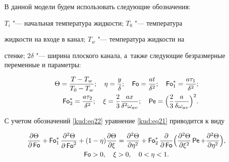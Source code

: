 В данной модели будем использовать следующие обозначения:

 $T_{i}$ "--- начальная температура жидкости; $T_0$ "--- температура

жидкости на входе в канал; $T_{w}$ "--- температура жидкости на

стенке; $2\delta$ "--- ширина плоского канала, а~также  следующие  безразмерные переменные и параметры: 

\begin{equation}

\label{kud:eq22}

\begin{aligned}

\Theta=\frac{T-T_{w}}{T_0 -T_{w} };

\quad

\eta =\frac{y}{ \delta };

\quad

\operatorname{\sf Fo}=\frac{at}{\delta^2}; \quad

\operatorname{\sf Fo}_1^* =\frac{a \tau_1}{ \delta^2}; \\

\operatorname{\sf Fo}_2^* =\frac{a \tau_2 }{ \delta^2}; \quad

\xi=\frac{2}{3}\frac{ax}{ \delta^ 2 \omega_{av} }; \quad

\operatorname{\sf Pe}=\Bigl(\frac{2}{3}\frac{a}{\delta \omega_{av} }

\Bigr)^2.

\end{aligned}

\end{equation}

С учетом обозначений \eqref{kud:eq22} уравнение \eqref{kud:eq21} приводится к виду

\begin{equation}

\label{kud:eq23}

\begin{array}{c}

\displaystyle 

\frac{\partial  \Theta}{\partial \operatorname{\sf Fo}}+

\operatorname{\sf Fo}_1 ^* \frac{\partial^2 \Theta}{\partial \operatorname{\sf Fo}^ {2}}+(1- \eta

)\frac{\partial  \Theta}{\partial  \xi} =\frac{\partial

^2 \Theta}{\partial \eta^2}+\operatorname{\sf Fo}_2^* \frac{\partial

}{\partial \operatorname{\sf Fo}}

\Bigl(\frac{\partial^2 \Theta}{\partial  \xi^2} \operatorname{\sf Pe}+\frac{\partial^2 \Theta}{\partial  \eta

^2} \Bigr),

\\[3mm]

\operatorname{\sf Fo}>0, \quad  \xi>0, \quad  0<\eta<1.

\end{array}

\end{equation}




